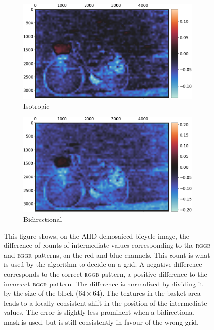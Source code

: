\documentclass{ipol}
\begin{document}
\begin{figure}[ht]
\centering
\begin{subfigure}[t]{.5\linewidth}
\includegraphics[width=\linewidth]{images/bike/ahd_iso_64_diff_rggb_bggr.png}
\caption{Isotropic}
\end{subfigure}%
\begin{subfigure}[t]{.5\linewidth}
\includegraphics[width=\linewidth]{images/bike/ahd_bid_64_diff_rggb_bggr.png}
\caption{Bidirectional}
\end{subfigure}%
\caption{This figure shows, on the AHD-demosaiced bicycle image, the difference of counts of intermediate values corresponding to the \textsc{rggb} and \textsc{bggr} patterns, on the red and blue channels. This count is what is used by the algorithm to decide on a grid. A negative difference corresponds to the correct \textsc{rggb} pattern, a positive difference to the incorrect \textsc{bggr} pattern. The difference is normalized by dividing it by the size of the block ($64\times64$). The textures in the basket area leads to a locally consistent shift in the position of the intermediate values. The error is slightly less prominent when a bidirectional mask is used, but is still consistently in favour of the wrong grid.}
\end{figure}
\end{document}
